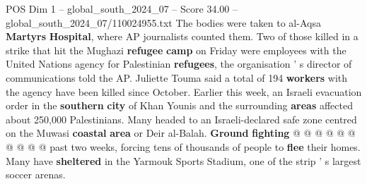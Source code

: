 \begin{textsample}{POS Dim 1 – global\_south\_2024\_07 – Score 34.00 – global\_south\_2024\_07/110024955.txt}
The bodies were taken to al-Aqsa \textbf{Martyrs} \textbf{Hospital}, where AP journalists counted them.
Two of those killed in a strike that hit the Mughazi \textbf{refugee} \textbf{camp} on Friday were employees with the United Nations agency for Palestinian \textbf{refugees}, the organisation ' s director of communications told the AP.
Juliette Touma said a total of 194 \textbf{workers} with the agency have been killed since October.
Earlier this week, an Israeli evacuation order in the \textbf{southern} \textbf{city} of Khan Younis and the surrounding \textbf{areas} affected about 250,000 Palestinians.
Many headed to an Israeli-declared safe zone centred on the Muwasi \textbf{coastal} \textbf{area} or Deir al-Balah. \textbf{Ground} \textbf{fighting} @ @ @ @ @ @ @ @ @ @ past two weeks, forcing tens of thousands of people to \textbf{flee} their homes.
Many have \textbf{sheltered} in the Yarmouk Sports Stadium, one of the strip ' s largest soccer arenas.

\end{textsample}
